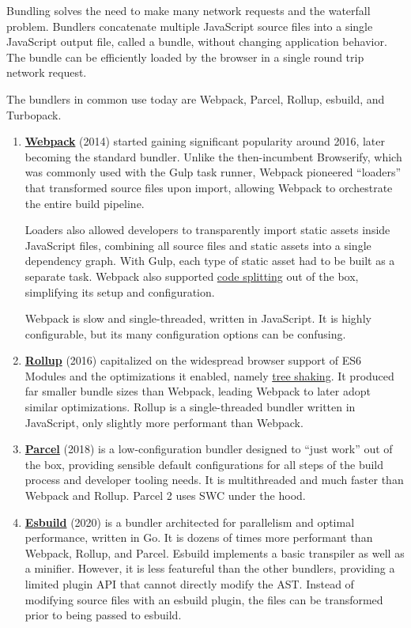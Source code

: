 \documentclass{article}
\newcommand{\tb}{\textbf}
\newcommand{\hl}{\hyperlink}
\begin{document}
Bundling solves the need to make many network requests and the waterfall problem. Bundlers
concatenate multiple JavaScript source files into a single JavaScript output file, called a bundle,
without changing application behavior. The bundle can be efficiently loaded by the browser in a
single round trip network request.

The bundlers in common use today are Webpack, Parcel, Rollup, esbuild, and Turbopack.

\begin{enumerate}
  \item \href{https://webpack.js.org/}{\tb{Webpack}} (2014) started gaining significant popularity
    around 2016, later becoming the standard bundler. Unlike the then-incumbent Browserify, which
    was commonly used with the Gulp task runner, Webpack pioneered ``loaders'' that transformed
    source files upon import, allowing Webpack to orchestrate the entire build pipeline.

    Loaders also allowed developers to transparently import static assets inside JavaScript files,
    combining all source files and static assets into a single dependency graph. With Gulp, each
    type of static asset had to be built as a separate task. Webpack also supported
    \hl{code-splitting}{code splitting} out of the box, simplifying its setup and configuration.

    Webpack is slow and single-threaded, written in JavaScript. It is highly configurable, but its
    many configuration options can be confusing.

  \item \href{https://rollupjs.org/}{\tb{Rollup}} (2016) capitalized on the widespread browser
    support of ES6 Modules and the optimizations it enabled, namely \hl{tree-shaking}{tree shaking}.
    It produced far smaller bundle sizes than Webpack, leading Webpack to later adopt similar
    optimizations. Rollup is a single-threaded bundler written in JavaScript, only slightly more
    performant than Webpack.

  \item \href{https://parceljs.org/}{\tb{Parcel}} (2018) is a low-configuration bundler designed to
    ``just work'' out of the box, providing sensible default configurations for all steps of the
    build process and developer tooling needs. It is multithreaded and much faster than Webpack and
    Rollup. Parcel 2 uses SWC under the hood.

  \item \href{https://esbuild.github.io/}{\tb{Esbuild}} (2020) is a bundler architected for
    parallelism and optimal performance, written in Go. It is dozens of times more performant than
    Webpack, Rollup, and Parcel. Esbuild implements a basic transpiler as well as a minifier.
    However, it is less featureful than the other bundlers, providing a limited plugin API that
    cannot directly modify the AST. Instead of modifying source files with an esbuild plugin, the
    files can be transformed prior to being passed to esbuild.


\end{enumerate}
\end{document}
